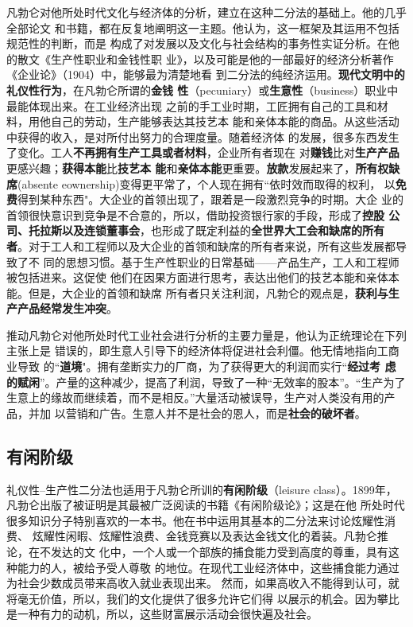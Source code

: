 凡勃仑对他所处时代文化与经济体的分析，建立在这种二分法的基础上。他的几乎全部论文
和书籍，都在反复地阐明这一主题。他认为，这一框架及其运用不包括规范性的判断，而是
构成了对发展以及文化与社会结构的事务性实证分析。在他的散文《生产性职业和金钱性职
业》，以及可能是他的一部最好的经济分析著作《企业论》（1904）中，能够最为清楚地看
到二分法的纯经济运用。\textbf{现代文明中的礼仪性行为}，在凡勃仑所谓的\textbf{金钱
  性}（pecuniary）或\textbf{生意性}（business）职业中最能体现出来。在工业经济出现
之前的手工业时期，工匠拥有自己的工具和材料，用他自己的劳动，生产能够表达其技艺本
能和亲体本能的商品。从这些活动中获得的收入，是对所付出努力的合理度量。随着经济体
的发展，很多东西发生了变化。工人\textbf{不再拥有生产工具或者材料}，企业所有者现在
对\textbf{赚钱}比对\textbf{生产产品}更感兴趣；\textbf{获得本能}比\textbf{技艺本
  能}和\textbf{亲体本能}更重要。\textbf{放款}发展起来了，\textbf{所有权缺
  席}(absente eownership)变得更平常了，个人现在拥有“依时效而取得的权利，
以\textbf{免费}得到某种东西"。大企业的首领出现了，跟着是一段激烈竞争的时期。大企
业的首领很快意识到竞争是不合意的，所以，借助投资银行家的手段，形成了\textbf{控股
  公司、托拉斯以及连锁董事会}，也形成了既定利益的\textbf{全世界大工会和缺席的所有
  者}。对于工人和工程师以及大企业的首领和缺席的所有者来说，所有这些发展都导致了不
同的思想习惯。基于生产性职业的日常基础——产品生产，工人和工程师被包括进来。这促使
他们在因果方面进行思考，表达出他们的技艺本能和亲体本能。但是，大企业的首领和缺席
所有者只关注利润，凡勃仑的观点是，\textbf{获利与生产产品经常发生冲突}。

推动凡勃仑对他所处时代工业社会进行分析的主要力量是，他认为正统理论在下列主张上是
错误的，即生意人引导下的经济体将促进社会利僵。他无情地指向工商业导致
的“\textbf{道境}"。拥有垄断实力的厂商，为了获得更大的利润而实行“\textbf{经过考
  虑的赋闲}”。产量的这种减少，提高了利润，导致了一种“无效率的股本”。“生产为了
生意上的缘故而继续着，而不是相反。”大量活动被误导，生产对人类没有用的产品，并加
以营销和广告。生意人并不是社会的恩人，而是\textbf{社会的破坏者}。

\subsection{有闲阶级}

礼仪性--生产性二分法也适用于凡勃仑所训的\textbf{有闲阶级}（leisure
class）。1899年，凡勃仑出版了被证明是其最被广泛阅读的书籍《有闲阶级论》；这是在他
所处时代很多知识分子特别喜欢的一本书。他在书中运用其基本的二分法来讨论炫耀性消费、
炫耀性闲暇、炫耀性浪费、金钱竞赛以及表达金钱文化的着装。凡勃仑推论，在不发达的文
化中，一个人或一个部族的捕食能力受到高度的尊重，具有这种能力的人，被给予受人尊敬
的地位。在现代工业经济体中，这些捕食能力通过为社会少数成员带来高收入就业表现出来。
然而，如果高收入不能得到认可，就将毫无价值，所以，我们的文化提供了很多允许它们得
以展示的机会。因为攀比是一种有力的动机，所以，这些财富展示活动会很快遍及社会。

